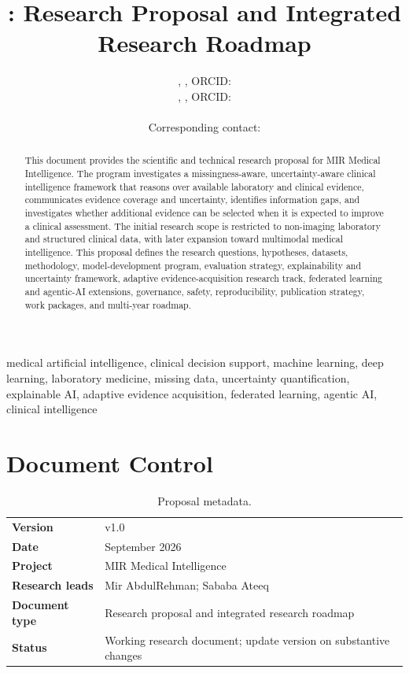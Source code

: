 \documentclass[11pt,journal,onecolumn,draftclsnofoot]{IEEEtran}
\title{\ProjectName: Research Proposal and Integrated Research Roadmap}
\author{\MirName, \MirRole, ORCID: \href{https://orcid.org/\MirORCID}{\MirORCID}\\
\SababaName, \SababaRole, ORCID: \href{https://orcid.org/\SababaORCID}{\SababaORCID}\\
\ResearchAffiliation\\
Corresponding contact: \href{mailto:\ResearchEmail}{\ResearchEmail}}
\newcommand{\ProjectName}{MIR Medical Intelligence}
\newcommand{\ProjectVersion}{v1.0}
\newcommand{\ProjectDate}{September 2026}
\newcommand{\MirName}{Mir AbdulRehman}
\newcommand{\SababaName}{Sababa Ateeq}
\begin{document}
\maketitle

\begin{abstract}
This document provides the scientific and technical research proposal for \ProjectName. The program investigates a missingness-aware, uncertainty-aware clinical intelligence framework that reasons over available laboratory and clinical evidence, communicates evidence coverage and uncertainty, identifies information gaps, and investigates whether additional evidence can be selected when it is expected to improve a clinical assessment. The initial research scope is restricted to non-imaging laboratory and structured clinical data, with later expansion toward multimodal medical intelligence. This proposal defines the research questions, hypotheses, datasets, methodology, model-development program, evaluation strategy, explainability and uncertainty framework, adaptive evidence-acquisition research track, federated learning and agentic-AI extensions, governance, safety, reproducibility, publication strategy, work packages, and multi-year roadmap.
\end{abstract}

\begin{IEEEkeywords}
medical artificial intelligence, clinical decision support, machine learning, deep learning, laboratory medicine, missing data, uncertainty quantification, explainable AI, adaptive evidence acquisition, federated learning, agentic AI, clinical intelligence
\end{IEEEkeywords}

\section*{Document Control}
\begin{table}[H]
\centering
\caption{Proposal metadata.}
\label{tab:proposal-metadata}
\begin{tabularx}{\textwidth}{@{}>{\bfseries}lX@{}}
Version & \ProjectVersion \\
Date & \ProjectDate \\
Project & \ProjectName \\
Research leads & \MirName; \SababaName \\
Document type & Research proposal and integrated research roadmap \\
Status & Working research document; update version on substantive changes \\
\end{tabularx}
\end{table}
\end{document}
